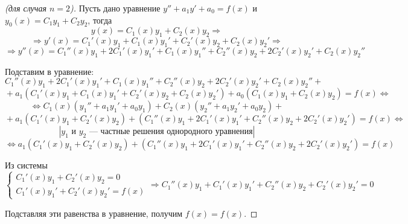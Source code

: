 \begin{proof}[(для случая $n = 2$)]
Пусть дано уравнение $y'' + a_1 y' + a_0 = f(x)$ и $y_0(x) = C_1 y_1 + C_2 y_2$, тогда
\begin{equation*}
y(x) = C_1(x) y_1 + C_2(x) y_2 \Rightarrow
\end{equation*}
\begin{equation*}
\Rightarrow y'(x) = C_1'(x) y_1 + C_1(x) y_1' + C_2'(x) y_2 + C_2(x) y_2' \Rightarrow
\end{equation*}
\begin{equation*}
\Rightarrow y''(x) = C_1''(x) y_1 + 2 C_1'(x) y_1' + C_1(x) y_1'' +
C_2''(x) y_2 + 2 C_2'(x) y_2' + C_2(x) y_2''
\end{equation*}

Подставим в уравнение:
\begin{equation*}
C_1''(x) y_1 + 2 C_1'(x) y_1' + C_1(x) y_1'' +
C_2''(x) y_2 + 2 C_2'(x) y_2' + C_2(x) y_2'' + {}
\end{equation*}
\begin{equation*}
{} + a_1 (C_1'(x) y_1 + C_1(x) y_1' + C_2'(x) y_2 + C_2(x) y_2') +
a_0 (C_1(x) y_1 + C_2(x) y_2) = f(x) \Leftrightarrow
\end{equation*}
\begin{equation*}
\Leftrightarrow C_1(x) (y_1'' + a_1 y_1' + a_0 y_1) +
C_2(x) (y_2'' + a_1 y_2' + a_0 y_2) + {}
\end{equation*}
\begin{equation*}
{} + a_1 (C_1'(x) y_1 + C_2'(x) y_2) +
(C_1''(x) y_1 + 2 C_1'(x) y_1' + C_2''(x) y_2 + 2 C_2'(x) y_2') = f(x) \Leftrightarrow
\end{equation*}
\begin{equation*}
\left| \text{$y_1$ и $y_2$~--- частные решения однородного уравнения} \right|
\end{equation*}
\begin{equation*}
\Leftrightarrow a_1 (C_1'(x) y_1 + C_2'(x) y_2) +
(C_1''(x) y_1 + 2 C_1'(x) y_1' + C_2''(x) y_2 + 2 C_2'(x) y_2') = f(x)
\end{equation*}

Из системы
\begin{equation*}
\begin{cases}
C_1'(x) y_1 + C_2'(x) y_2 = 0 \\
C_1'(x) y_1' + C_2'(x) y_2' = f(x)
\end{cases}
\Rightarrow C_1''(x) y_1 + C_1'(x) y_1' + C_2''(x) y_2 + C_2'(x) y_2' = 0
\end{equation*}

Подставляя эти равенства в уравнение, получим $f(x) = f(x)$.
\end{proof}

